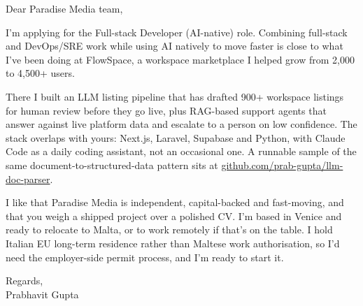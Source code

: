 \documentclass[a4paper,11pt]{article}
\begin{document}
Dear Paradise Media team,

I'm applying for the Full-stack Developer (AI-native) role. Combining full-stack and DevOps/SRE work while using AI natively to move faster is close to what I've been doing at FlowSpace, a workspace marketplace I helped grow from 2,000 to 4,500+ users.

There I built an LLM listing pipeline that has drafted 900+ workspace listings for human review before they go live, plus RAG-based support agents that answer against live platform data and escalate to a person on low confidence. The stack overlaps with yours: Next.js, Laravel, Supabase and Python, with Claude Code as a daily coding assistant, not an occasional one. A runnable sample of the same document-to-structured-data pattern sits at \href{https://github.com/prab-gupta/llm-doc-parser}{github.com/prab-gupta/llm-doc-parser}.

I like that Paradise Media is independent, capital-backed and fast-moving, and that you weigh a shipped project over a polished CV. I'm based in Venice and ready to relocate to Malta, or to work remotely if that's on the table. I hold Italian EU long-term residence rather than Maltese work authorisation, so I'd need the employer-side permit process, and I'm ready to start it.

Regards,\\
Prabhavit Gupta
\end{document}
